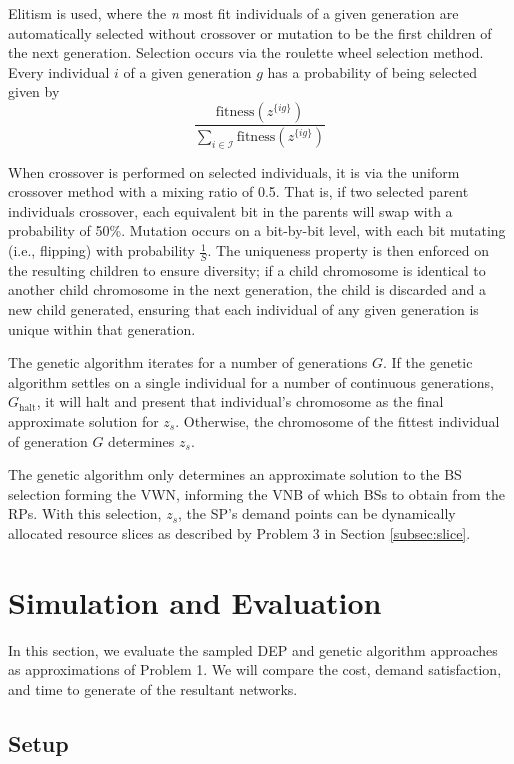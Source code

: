 \documentclass[conference]{IEEEtran}
\begin{document}
Elitism is used, where the \textit{n} most fit individuals of a given generation are automatically selected without crossover or mutation to be the first children of the next generation.  Selection occurs via the roulette wheel selection method.  Every individual $i$ of a given generation $g$ has a probability of being selected given by
\[
\frac{\text{fitness}\left( z^{\{ig\}} \right)}{\sum_{i \in \mathcal{I}} \text{fitness}\left( z^{\{ig\}} \right)}
\]

When crossover is performed on selected individuals, it is via the uniform crossover method with a mixing ratio of 0.5.  That is, if two selected parent individuals crossover, each equivalent bit in the parents will swap with a probability of 50\%.  Mutation occurs on a bit-by-bit level, with each bit mutating (i.e., flipping) with probability $\frac{1}{S}$.  The uniqueness property is then enforced on the resulting children to ensure diversity; if a child chromosome is identical to another child chromosome in the next generation, the child is discarded and a new child generated, ensuring that each individual of any given generation is unique within that generation.

The genetic algorithm iterates for a number of generations $G$.  If the genetic algorithm settles on a single individual for a number of continuous generations, $G_\text{halt}$, it will halt and present that individual's chromosome as the final approximate solution for $z_s$.  Otherwise, the chromosome of the fittest individual of generation $G$ determines $z_s$.

The genetic algorithm only determines an approximate solution to the BS selection forming the VWN, informing the VNB of which BSs to obtain from the RPs.  With this selection, $z_s$, the SP's demand points can be dynamically allocated resource slices as described by Problem 3 in Section \ref{subsec:slice}.

\section{Simulation and Evaluation} \label{sec:sim}
In this section, we evaluate the sampled DEP and genetic algorithm approaches as approximations of Problem 1.  We will compare the cost, demand satisfaction, and time to generate of the resultant networks.

\subsection{Setup} \label{subsec:setup}
\end{document}
